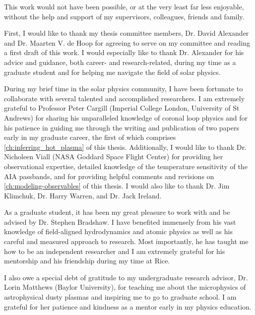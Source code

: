 
\begin{acknowledgements}      

This work would not have been possible, or at the very least far less enjoyable, without the help and support of my supervisors, colleagues, friends and family. 

First, I would like to thank my thesis committee members, Dr. David Alexander and Dr. Maarten V. de Hoop for agreeing to serve on my committee and reading a first draft of this work. I would especially like to thank Dr. Alexander for his advice and guidance, both career- and research-related, during my time as a graduate student and for helping me navigate the field of solar physics.

During my brief time in the solar physics community, I have been fortunate to collaborate with several talented and accomplished researchers. I am extremely grateful to Professor Peter Cargill (Imperial College London, University of St Andrews) for sharing his unparalleled knowledge of coronal loop physics and for his patience in guiding me through the writing and publication of two papers early in my graduate career, the first of which comprises \autoref{ch:inferring_hot_plasma} of this thesis. Additionally, I would like to thank Dr. Nicholeen Viall (NASA Goddard Space Flight Center) for providing her observational expertise, detailed knowledge of the temperature sensitivity of the AIA passbands, and for providing helpful comments and revisions on \autoref{ch:modeling-observables} of this thesis. I would also like to thank Dr. Jim Klimchuk, Dr. Harry Warren, and Dr. Jack Ireland.

As a graduate student, it has been my great pleasure to work with and be advised by Dr. Stephen Bradshaw. I have benefited immensely from his vast knowledge of field-aligned hydrodynamics and atomic physics as well as his careful and measured approach to research. Most importantly, he has taught me how to be an independent researcher and I am extremely grateful for his mentorship and his friendship during my time at Rice.

I also owe a special debt of gratitude to my undergraduate research advisor, Dr. Lorin Matthews (Baylor University), for teaching me about the microphysics of astrophysical dusty plasmas and inspiring me to go to graduate school. I am grateful for her patience and kindness as a mentor early in my physics education.


\end{acknowledgements}
